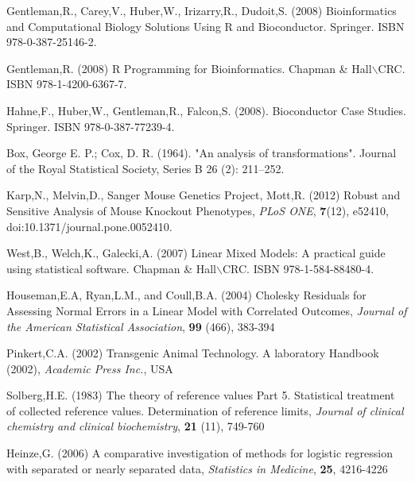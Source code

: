 \documentclass[12pt,a4paper]{article}
\begin{document}
\begin{thebibliography}{}

Gentleman,R., Carey,V., Huber,W., Irizarry,R., Dudoit,S.  (2008) Bioinformatics and Computational Biology Solutions Using R and Bioconductor. Springer.  ISBN 978-0-387-25146-2.

Gentleman,R. (2008) R Programming for Bioinformatics. Chapman \& Hall$\backslash$CRC. ISBN 978-1-4200-6367-7.

Hahne,F., Huber,W., Gentleman,R., Falcon,S. (2008). Bioconductor Case Studies. Springer.  ISBN 978-0-387-77239-4.

Box, George E. P.; Cox, D. R. (1964). "An analysis of transformations". Journal of the Royal Statistical Society, Series B 26 (2): 211–252. 

 Karp,N., Melvin,D., Sanger Mouse Genetics Project, Mott,R. (2012) Robust and Sensitive Analysis of Mouse Knockout Phenotypes, {\it PLoS ONE}, {\bf 7}(12), e52410, doi:10.1371/journal.pone.0052410.

  West,B., Welch,K., Galecki,A. (2007) Linear Mixed Models: A practical guide using statistical software. Chapman \& Hall$\backslash$CRC. ISBN 978-1-584-88480-4.

 Houseman,E.A, Ryan,L.M., and Coull,B.A. (2004) Cholesky Residuals for Assessing Normal Errors in a Linear Model with Correlated Outcomes, {\it Journal of the American Statistical Association}, {\bf 99} (466), 383-394

 Pinkert,C.A. (2002) Transgenic Animal Technology. A laboratory Handbook (2002), {\it Academic Press Inc.}, USA

 Solberg,H.E. (1983) The theory of reference values Part 5. Statistical treatment of collected reference values. Determination of reference limits, {\it Journal of clinical chemistry and clinical biochemistry}, {\bf 21} (11), 749-760

 Heinze,G. (2006) A comparative investigation of methods for logistic regression with separated or nearly separated data, {\it Statistics in Medicine}, {\bf 25}, 4216-4226


\end{thebibliography}
\end{document}
